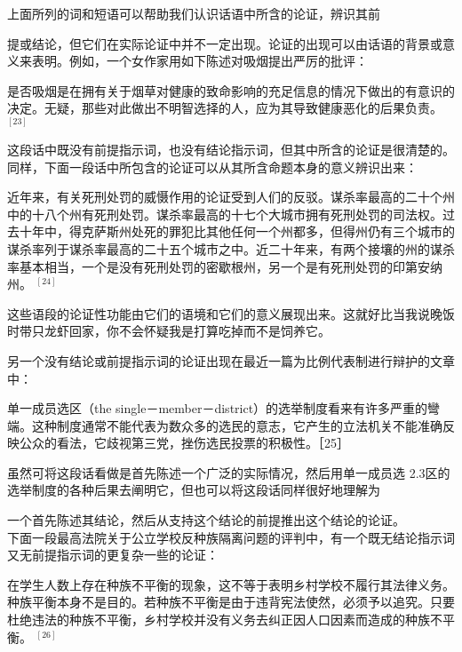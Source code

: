 上面所列的词和短语可以帮助我们认识话语中所含的论证，辨识其前

提或结论，但它们在实际论证中并不一定出现。论证的出现可以由话语的背景或意义来表明。例如，一个女作家用如下陈述对吸烟提出严厉的批评：

是否吸烟是在拥有关于烟草对健康的致命影响的充足信息的情况下做出的有意识的决定。无疑，那些对此做出不明智选择的人，应为其导致健康恶化的后果负责。 ${ }^{[23]}$

这段话中既没有前提指示词，也没有结论指示词，但其中所含的论证是很清楚的。同样，下面一段话中所包含的论证可以从其所含命题本身的意义辨识出来：

\begin{displayquote}
近年来，有关死刑处罚的威慑作用的论证受到人们的反驳。谋杀率最高的二十个州中的十八个州有死刑处罚。谋杀率最高的十七个大城市拥有死刑处罚的司法权。过去十年中，得克萨斯州处死的罪犯比其他任何一个州都多，但得州仍有三个城市的谋杀率列于谋杀率最高的二十五个城市之中。近二十年来，有两个接壤的州的谋杀率基本相当，一个是没有死刑处罚的密歇根州，另一个是有死刑处罚的印第安纳州。 ${ }^{[24]}$
\end{displayquote}

这些语段的论证性功能由它们的语境和它们的意义展现出来。这就好比当我说晚饭时带只龙虾回家，你不会怀疑我是打算吃掉而不是饲养它。

另一个没有结论或前提指示词的论证出现在最近一篇为比例代表制进行辩护的文章中：

单一成员选区（the single－member－district）的选举制度看来有许多严重的彎端。这种制度通常不能代表为数众多的选民的意志，它产生的立法机关不能准确反映公众的看法，它歧视第三党，挫伤选民投票的积极性。［25］

虽然可将这段话看做是首先陈述一个广泛的实际情况，然后用单一成员选 2.3区的选举制度的各种后果去阐明它，但也可以将这段话同样很好地理解为

一个首先陈述其结论，然后从支持这个结论的前提推出这个结论的论证。\\
下面一段最高法院关于公立学校反种族隔离问题的评判中，有一个既无结论指示词又无前提指示词的更复杂一些的论证：

\begin{displayquote}
在学生人数上存在种族不平衡的现象，这不等于表明乡村学校不履行其法律义务。种族平衡本身不是目的。若种族不平衡是由于违背宪法使然，必须予以追究。只要杜绝违法的种族不平衡，乡村学校并没有义务去纠正因人口因素而造成的种族不平衡。 ${ }^{[26]}$
\end{displayquote}

